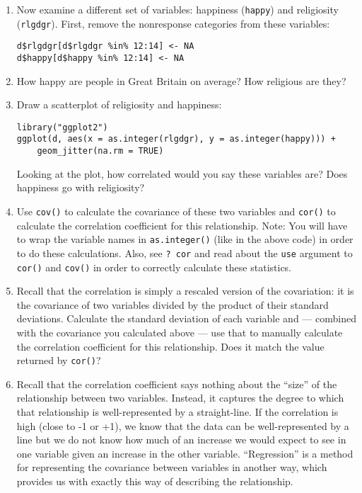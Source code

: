 \documentclass[a4paper,12pt]{article}
\begin{document}
\begin{enumerate}
\item Now examine a different set of variables: happiness (\texttt{happy}) and religiosity (\texttt{rlgdgr}). First, remove the nonresponse categories from these variables:

\begin{verbatim}
d$rlgdgr[d$rlgdgr %in% 12:14] <- NA
d$happy[d$happy %in% 12:14] <- NA
\end{verbatim}

\item How happy are people in Great Britain on average? How religious are they?

\item Draw a scatterplot of religiosity and happiness:

\begin{verbatim}
library("ggplot2")
ggplot(d, aes(x = as.integer(rlgdgr), y = as.integer(happy))) +
    geom_jitter(na.rm = TRUE)
\end{verbatim}

\noindent Looking at the plot, how correlated would you say these variables are? Does happiness go with religiosity?

\item Use \texttt{cov()} to calculate the covariance of these two variables and \texttt{cor()} to calculate the correlation coefficient for this relationship. Note: You will have to wrap the variable names in \texttt{as.integer()} (like in the above code) in order to do these calculations. Also, see \texttt{? cor} and read about the \texttt{use} argument to \texttt{cor()} and \texttt{cov()} in order to correctly calculate these statistics.

\item Recall that the correlation is simply a rescaled version of the covariation: it is the covariance of two variables divided by the product of their standard deviations. Calculate the standard deviation of each variable and --- combined with the covariance you calculated above --- use that to manually calculate the correlation coefficient for this relationship. Does it match the value returned by \texttt{cor()}?

\item Recall that the correlation coefficient says nothing about the ``size'' of the relationship between two variables. Instead, it captures the degree to which that relationship is well-represented by a straight-line. If the correlation is high (close to -1 or +1), we know that the data can be well-represented by a line but we do not know how much of an increase we would expect to see in one variable given an increase in the other variable. ``Regression'' is a method for representing the covariance between variables in another way, which provides us with exactly this way of describing the relationship.


\end{enumerate}
\end{document}
